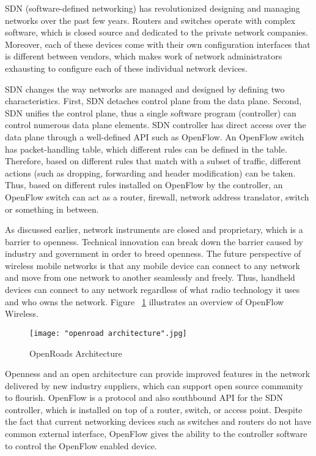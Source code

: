 \documentclass[english]{tktltiki2}
\theoremstyle{definition}
\theoremstyle{remark}
\begin{document}
SDN (software-defined networking) has revolutionized designing and managing networks over the past few years. Routers and switches operate with complex software, which is closed source and dedicated to the private network companies. Moreover, each of these devices come with their own configuration interfaces that is different between vendors, which makes work of network administrators exhausting to configure each of these individual network devices. \cite{FRZ13}

SDN changes the way networks are managed and designed by defining two characteristics. First, SDN detaches control plane from the data plane. Second, SDN unifies the control plane, thus a single software program (controller) can control numerous data plane elements. SDN controller has direct access over the data plane through a well-defined API such as OpenFlow. An OpenFlow switch has packet-handling table, which different rules can be defined in the table. Therefore, based on different rules that match with a subset of traffic, different actions (such as dropping, forwarding and header modification) can be taken. Thus, based on different rules installed on OpenFlow by the controller, an OpenFlow switch can act as a router, firewall, network address translator, switch or something in between. 

As discussed earlier, network instruments are closed and proprietary, which is a barrier to openness. Technical innovation can break down the barrier caused by industry and government in order to breed openness. The future perspective of wireless mobile networks is that any mobile device can connect to any network and move from one network to another seamlessly and freely. Thus, handheld devices can connect to any network regardless of what radio technology it uses and who owns the network. Figure ~\ref{fig:openroads} illustrates an overview of OpenFlow Wireless. \cite{Yap10a}

\begin{figure}[h!t]
\centering
{}
\texttt{[image: "openroad architecture".jpg]}
\caption{OpenRoads Architecture \cite{Yap10b}}
\label{fig:openroads}
\end{figure}

Openness and an open architecture can provide improved features in the network delivered by new industry suppliers, which can support open source community to flourish. OpenFlow is a protocol and also southbound API for the SDN controller, which is installed on top of a router, switch, or access point. Despite the fact that current networking devices such as switches and routers do not have common external interface, OpenFlow gives the ability to the controller software to control the OpenFlow enabled device. 
\end{document}

